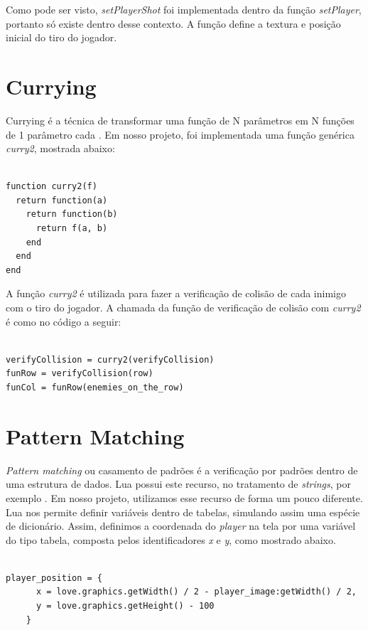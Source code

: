\documentclass[rel_mlp]{iiufrgs}
\begin{document}
Como pode ser visto, \textit{setPlayerShot} foi implementada dentro da função \textit{setPlayer}, portanto só existe dentro desse contexto. A função define a textura e posição inicial do tiro do jogador.

\section{Currying} \label{Currying}

Currying é a técnica de transformar uma função de N parâmetros em N funções de 1 parâmetro cada \cite{CurryingLua}. Em nosso projeto, foi implementada uma função genérica \textit{curry2}, mostrada abaixo:

\clearpage

\begin{lstlisting}

function curry2(f)
  return function(a)
    return function(b)
      return f(a, b)
    end
  end
end

\end{lstlisting}

A função \textit{curry2} é utilizada para fazer a verificação de colisão de cada inimigo com o tiro do jogador. A chamada da função de verificação de colisão com \textit{curry2} é como no código a seguir:

\begin{lstlisting}

verifyCollision = curry2(verifyCollision)
funRow = verifyCollision(row)
funCol = funRow(enemies_on_the_row)

\end{lstlisting}

\section{Pattern Matching}

\textit{Pattern matching} ou casamento de padrões é a verificação por padrões dentro de uma estrutura de dados. Lua possui este recurso, no tratamento de \textit{strings}, por exemplo \cite{PatternMatchingLua}. Em nosso projeto, utilizamos esse recurso de forma um pouco diferente. Lua nos permite definir variáveis dentro de tabelas, simulando assim uma espécie de dicionário. Assim, definimos a coordenada do \textit{player} na tela por uma variável do tipo tabela, composta pelos identificadores \textit{x} e \textit{y}, como mostrado abaixo.

\begin{lstlisting}

player_position = {
      x = love.graphics.getWidth() / 2 - player_image:getWidth() / 2,
      y = love.graphics.getHeight() - 100
    }

\end{lstlisting}
\end{document}
